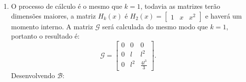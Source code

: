 \begin{tcolorbox}[breakable, colback=white, colframe=black, boxrule=0.4pt, arc=0pt, outer arc=0pt]
\begin{enumerate}[label=\alph*), leftmargin=*]
$$\begin{aligned}
                \left( \begin{bmatrix} 0 & 0 \\ M_0(x) & M_1(x) \end{bmatrix}\right)\Big|_{0}^{l_e} = \begin{bmatrix} 0 & 0 \\ M_0(l_e) & M_1(l_e) \end{bmatrix} - \begin{bmatrix} 0 & 0 \\ M_0(0) & M_1(0) \end{bmatrix} =\\
                \begin{bmatrix} 0 & 0 \\ M_0(l_e) - M_0(0) & M_1(l_e) - M_1(0) \end{bmatrix} = \begin{bmatrix} 0 & 0 \\ -1 & 1 \end{bmatrix}.
            \end{aligned}$$
            $$\mathcal{G} = \begin{bmatrix} 2 & l \\ 0 & l_e \end{bmatrix} \quad \mathcal{B} = \begin{bmatrix} 1 & 1 \\ 1 & 1 \end{bmatrix}.$$
            Conhecidas $\mathcal{G}$ e $\mathcal{B}$ calcula-se o projetor elíptico na base polinomial: $$\Pi_{1,*}^{\Omega,\nabla} = \mathcal{G}^{-1} \mathcal{B} = \frac{1}{l_e} \begin{bmatrix} l_e  & 0 \\ -1 & 1 \end{bmatrix}.$$
            \vspace{2mm}
            \item O processo de cálculo é o mesmo que $k=1$, todavia as matrizes terão dimensões maiores, a matriz $H_k(x)$ é $H_2(x) = \begin{bmatrix} 1 & x & x^2 \end{bmatrix}$ e haverá um momento interno. A matriz $\mathcal{G}$ será calculada do mesmo modo que $k=1$, portanto o resultado é: $$\mathcal{G} = \begin{bmatrix} 0 & 0 & 0 \\ 0 & l & l^2 \\ 0 & l^2 & \frac{4l^3}{3} \end{bmatrix}.$$
            \indent Desenvolvendo $\mathcal{B}$: 

\end{enumerate}
\end{tcolorbox}
